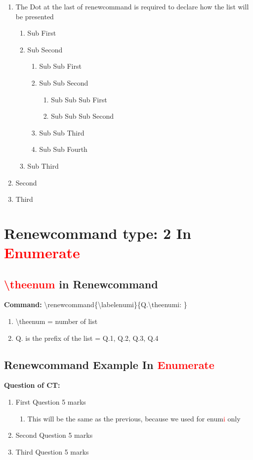 \documentclass[a4paper, 10pt]{book}
\begin{document}
\begin{enumerate}
	\item The Dot at the last of renewcommand is required to declare how the list will be presented
	\begin{enumerate}
		\item Sub First
		\item Sub Second
		\begin{enumerate}
			\item Sub Sub First
			\item Sub Sub Second
			\begin{enumerate}
				\item Sub Sub Sub First
				\item Sub Sub Sub Second
			\end{enumerate}
			\item Sub Sub Third
			\item Sub Sub Fourth
		\end{enumerate}
		\item Sub Third
	\end{enumerate}
	\item Second
	\item Third
\end{enumerate}

\section{Renewcommand type: 2 In \textcolor{red}{Enumerate}}
\subsection{  \textcolor{red}{\textbackslash theenum}  in Renewcommand}
\textbf{Command:} \textbackslash renewcommand\{\textbackslash labelenumi\}\{Q.\textbackslash theenumi: \}
\begin{enumerate}
	\item \textbackslash theenum = number of list
	\item Q. is the prefix of the list = Q.1, Q.2, Q.3, Q.4
\end{enumerate}
\subsection{Renewcommand Example In \textcolor{red}{Enumerate}}

\renewcommand{\labelenumi}{Q.\theenumi:}
\renewcommand{\labelenumii}{.\theenumii:}

\textbf{Question of CT:}
\begin{enumerate}
	\item First Question 	\hfill 5 marks
	\begin{enumerate}
		\item This will be the same as the previous, because we used for enum\textcolor{red}{i} only
	\end{enumerate}
	\item Second Question	\hfill 5 marks
	\item Third Question	\hfill 5 marks
\end{enumerate}
\end{document}
